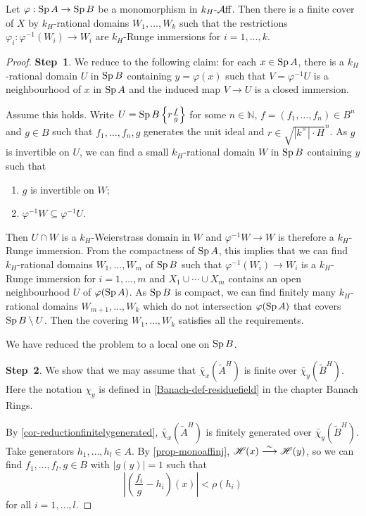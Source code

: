\begin{thm}\label{thm-GG}
    Let $\varphi:\operatorname{Sp} A\rightarrow \operatorname{Sp} B$ be a monomorphism in $k_H\text{-}\mathcal{A}\mathrm{ff}$. Then there is a finite cover of $X$ by $k_H$-rational domains $W_1,\ldots,W_k$ such that the restrictions $\varphi_i:\varphi^{-1}(W_i)\rightarrow W_i$ are $k_H$-Runge immersions for $i=1,\ldots,k$.
\end{thm}
\begin{proof}
    \textbf{Step~1}. We reduce to the following claim: for each $x\in \operatorname{Sp} A$, there is a $k_H$-rational domain $U$ in $\operatorname{Sp} B$ containing $y=\varphi(x)$ such that $V=\varphi^{-1}U$ is a neighbourhood of $x$ in $\operatorname{Sp} A$ and the induced map $V\rightarrow U$ is a closed immersion.

    Assume this holds. Write $U=\operatorname{Sp} B\left\{r\frac{f}{g}\right\}$ for some $n\in \mathbb{N}$, $f=(f_1,\ldots,f_n)\in B^n$ and $g\in B$ such that $f_1,\ldots,f_n,g$ generates the unit ideal and $r\in \sqrt{|k^{\times}|\cdot H}^n$. As $g$ is invertible on $U$, we can find a small $k_H$-rational domain $W$ in $\operatorname{Sp} B$ containing $y$ such that
    \begin{enumerate}
        \item $g$ is invertible on $W$;
        \item $\varphi^{-1}W \subseteq \varphi^{-1}U$.
    \end{enumerate}
    Then $U\cap W$ is a $k_H$-Weierstrass domain in $W$ and $\varphi^{-1}W\rightarrow W$ is therefore a $k_H$-Runge immersion. From the compactness of $\operatorname{Sp} A$, this implies that we can find $k_H$-rational domains $W_1,\ldots,W_m$ of $\operatorname{Sp} B$ such that $\varphi^{-1}(W_i)\rightarrow W_i$ is a $k_H$-Runge immersion for $i=1,\ldots,m$ and $X_1\cup\cdots\cup X_m$ contains an open neighbourhood $U$ of $\varphi(\operatorname{Sp} A)$. As $\operatorname{Sp} B$ is compact, we can find finitely many $k_H$-rational domains $W_{m+1},\ldots,W_{k}$ which do not intersection $\varphi(\operatorname{Sp} A)$ that covers $\operatorname{Sp} B\setminus U$. Then the covering $W_1,\ldots,W_k$ satisfies all the requirements.
    
    We have reduced the problem to a local one on $\operatorname{Sp} B$.


    \textbf{Step~2}. We show that we may assume that $\widetilde{\chi_x}(\tilde{A}^H)$ is finite over $\widetilde{\chi_y}(\tilde{B}^H)$. Here the notation $\chi_y$ is defined in \cref{Banach-def-residuefield} in the chapter Banach Rings.

    By \cref{cor-reductionfinitelygenerated}, $\widetilde{\chi_x}(\tilde{A}^H)$ is finitely generated over $\widetilde{\chi_y}(\tilde{B}^H)$. Take  generators $h_1,\ldots,h_l\in A$. By \cref{prop-monoaffinj}, $\mathscr{H}(x)\stackrel{\sim}{\longrightarrow} \mathscr{H}(y)$, so we can find $f_1,\ldots,f_l,g\in B$ with $|g(y)|=1$ such that 
    \[
        \left| \left(\frac{f_i}{g}-h_i\right)(x) \right|<\rho(h_i)  
    \]
    for all $i=1,\ldots,l$. 
    

\end{proof}

